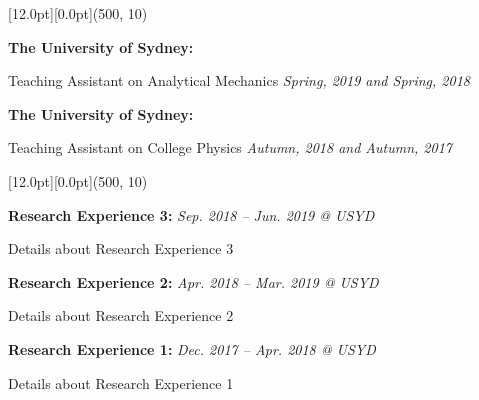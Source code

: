 \documentclass[12pt,a4paper]{report}
\begin{document}
    \begin{center}\begin{minipage}[t]{512pt}
        \colorbox{subtitlecolor}{\raisebox{0pt}[12.0pt][0.0pt]{\makebox(500, 10){
            \textcolor{white}{\ttfamily{}\selectfont{}}}}}\end{minipage}\end{center}
    \begin{center}
       \begin{minipage}[t]{460pt}
            {\textbf{The University of Sydney:}} \par
            \quad Teaching Assistant on Analytical Mechanics\hfill
            {\em{Spring, 2019 and Spring, 2018}} \par
            \vspace{4pt} \par
            {\textbf{The University of Sydney:}} \par
            \quad Teaching Assistant on College Physics\hfill
            {\em{Autumn, 2018 and Autumn, 2017}} \par
        \end{minipage}
    \end{center}
    \begin{center}\begin{minipage}[t]{512pt}
        \colorbox{subtitlecolor}{\raisebox{0pt}[12.0pt][0.0pt]{\makebox(500, 10){
            \textcolor{white}{\ttfamily{}\selectfont{}}}}}\end{minipage}\end{center}
    \begin{center}
        \begin{minipage}[t]{460pt}
            {\textbf{Research Experience 3:}} \hfill {\em{Sep. 2018 -- Jun. 2019 @ USYD}}\par
            \quad Details about Research Experience 3
            \vspace{4pt}\par
            {\textbf{Research Experience 2:}} \hfill {\em{Apr. 2018 -- Mar. 2019 @ USYD}}\par
            \quad Details about Research Experience 2
            \vspace{4pt}\par
            {\textbf{Research Experience 1:}} \hfill {\em{Dec. 2017 -- Apr. 2018 @ USYD}}\par
            \quad Details about Research Experience 1
        \end{minipage}
     \end{center}
\end{document}
